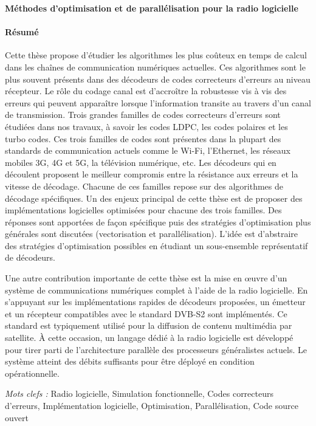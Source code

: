\documentclass[a4paper, 11pt]{article}
\begin{document}
\thispagestyle{empty}

\noindent
{\large \textbf{\og Méthodes d'optimisation et de parallélisation pour la radio
                logicielle \fg}}

\paragraph{Résumé}

Cette thèse propose d'étudier les algorithmes les plus coûteux en temps de
calcul dans les chaînes de communication numériques actuelles. Ces algorithmes
sont le plus souvent présents dans des décodeurs de codes correcteurs d'erreurs
au niveau récepteur. Le rôle du codage canal est d'accroître la robustesse vis à
vis des erreurs qui peuvent apparaître lorsque l'information transite au travers
d'un canal de transmission. Trois grandes familles de codes correcteurs
d'erreurs sont étudiées dans nos travaux, à savoir les codes LDPC, les codes
polaires et les turbo codes. Ces trois familles de codes sont présentes dans la
plupart des standards de communication actuels comme le Wi-Fi, l'Ethernet, les
réseaux mobiles 3G, 4G et 5G, la télévision numérique, etc. Les décodeurs qui en
découlent proposent le meilleur compromis entre la résistance aux erreurs et la
vitesse de décodage. Chacune de ces familles repose sur des algorithmes de
décodage spécifiques. Un des enjeux principal de cette thèse est de proposer des
implémentations logicielles optimisées pour chacune des trois familles. Des
réponses sont apportées de façon spécifique puis des stratégies d'optimisation
plus générales sont discutées (vectorisation et parallélisation). L'idée est
d'abstraire des stratégies d'optimisation possibles en étudiant un sous-ensemble
représentatif de décodeurs.

Une autre contribution importante de cette thèse est la mise en œuvre d'un
système de communications numériques complet à l'aide de la radio logicielle. En
s'appuyant sur les implémentations rapides de décodeurs proposées, un émetteur
et un récepteur compatibles avec le standard DVB-S2 sont implémentés. Ce
standard est typiquement utilisé pour la diffusion de contenu multimédia par
satellite. À cette occasion, un langage dédié à la radio logicielle est
développé pour tirer parti de l'architecture parallèle des processeurs
généralistes actuels. Le système atteint des débits suffisants pour être déployé
en condition opérationnelle.

\vskip0.5cm
\emph{Mots clefs :} Radio logicielle, Simulation fonctionnelle, Codes
                    correcteurs d'erreurs, Implémentation logicielle,
                    Optimisation, Parallélisation, Code source ouvert
\end{document}
